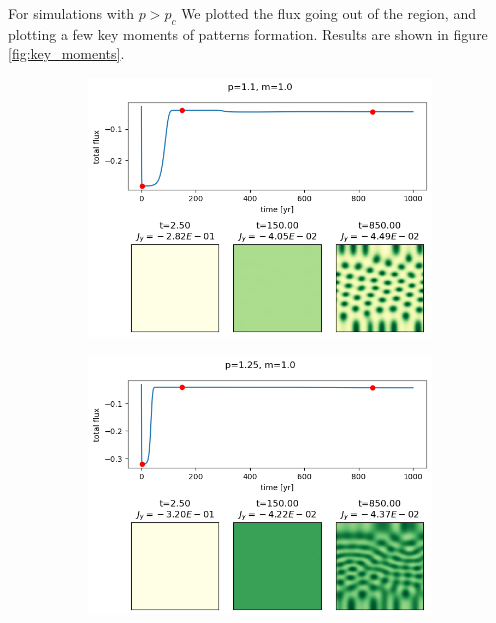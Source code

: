 \documentclass{article}
\numberwithin{equation}{section}
\begin{document}
For simulations with $p>p_c$ We plotted the flux going out of the region, and plotting a few key moments of patterns formation.  Results are shown in figure \ref{fig:key_moments}.

\begin{figure}[!h]
\centering
\begin{subfigure}[]{0.5\textwidth}
    \centering
    \includegraphics[scale=0.5]{plots/p1_1_m1_0.png}
    \label{fig:p1_1}
\end{subfigure}
\begin{subfigure}[]{0.5\textwidth}
    \centering
    \includegraphics[scale=0.5]{plots/p1_25_m1_0.png}
\end{subfigure}

\end{figure}
\end{document}
